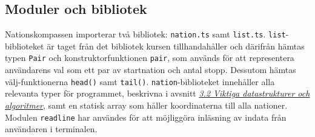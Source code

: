 \documentclass[a4paper, 12pt]{article}
\begin{document}
    \subsection{Moduler och bibliotek}
    \label{subsec: modul_och_bib}
        Nationskompassen importerar två bibliotek: \texttt{nation.ts} samt \texttt{list.ts}. \texttt{list}-biblioteket är taget från det bibliotek kursen tillhandahåller och därifrån hämtas typen \texttt{Pair} och konstruktorfunktionen \texttt{pair}, som används för att representera användarens val som ett par av startnation och antal stopp. Dessutom hämtas välj-funktionerna \texttt{head()} samt \texttt{tail()}. \texttt{nation}-biblioteket innehåller alla relevanta typer för programmet, beskrivna i avsnitt \hyperref[subsec: DSAL]{\textit{3.2 Viktiga datastrukturer och algoritmer}}, samt en statisk array som håller koordinaterna till alla nationer. Modulen \texttt{readline} har användes för att möjliggöra inläsning av indata från användaren i terminalen.
\end{document}
